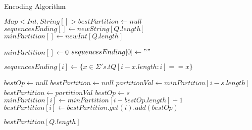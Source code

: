\begin{algorithm}
\caption{Encoding Algorithm}
\label{Encoding Algorithm}
\begin{algorithmic}[1]

\State $Map<Int,String[]> bestPartition \gets null$
\State $sequencesEnding[] \gets new String[Q.length]$
\State $minPartition[] \gets new Int[Q.length]$

\State $minPartition[] \gets 0$
\State $sequencesEnding[0] \gets ""$

	 $sequencesEnding[i] \gets \{x \in \Sigma' s.t Q[i-x.length:i] == x\}$
\EndFor

	\State $bestOp \gets null$
	\State $bestPartition \gets null$ 
		\State $partitionVal \gets minPartition[i-s.length]$
			\State $bestPartition \gets partitionVal$ 
			\State $bestOp \gets s$
		\EndIf
	\EndFor
	\State $minPartition[i] \gets minPartition[i-bestOp.length] + 1$
	\State $bestPartition[i] \gets bestPartition.get(i).add(bestOp) $
\EndFor

\Return $bestPartition[Q.length]$

\EndProcedure
\end{algorithmic}
\end{algorithm}
